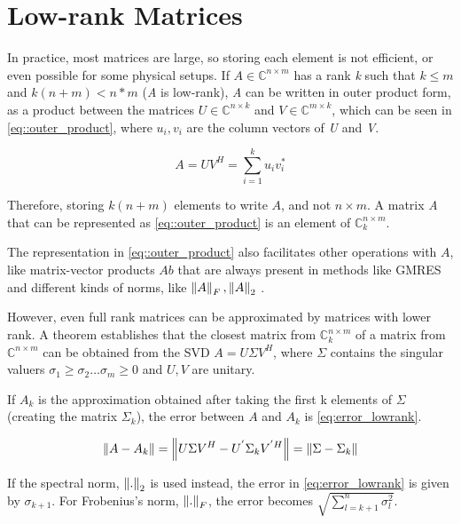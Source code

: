 \section{Low-rank Matrices}

In practice, most matrices are large, so storing each element is not efficient, or even possible for some physical setups. If $A \in \mathbb{C}^{n\times m}$ has a rank \textit{k} such that $k \leq m$ and $k(n+m) < n*m$ (\textit{A} is low-rank), \textit{A} can be written in outer product form, as a product between the matrices $U \in \mathbb{C}^{n\times k} $ and $V \in \mathbb{C}^{m\times k}$, which can be seen in \ref{eq::outer_product}, where $u_{i}, v_{i}$ are the column vectors of \textit{U} and \textit{V}.

\begin{equation}\label{eq::outer_product}
    A = UV^{H} = \sum_{i=1} ^{k} u_{i} v_{i} ^{*}
\end{equation}


Therefore, storing $k(n+m)$ elements to write $A$, and not $n\times m$. A matrix \textit{A} that can be represented as \ref{eq::outer_product} is an element of $\mathbb{C}^{n\times m}_{k}$.

The representation in \ref{eq::outer_product} also facilitates other operations with $A$, like matrix-vector products $Ab$ that are always present in methods like GMRES \cite{bebendorf2008hierarchical} and different kinds of norms, like $\left\lVert A\right\rVert_{F}, \left\lVert A\right\rVert_{2}$ \cite{bebendorf2008hierarchical}.

However, even full rank matrices can be approximated by matrices with lower rank. A theorem \cite{bebendorf2008hierarchical} establishes that the closest matrix from $\mathbb{C}^{n\times m}_{k}$ of a matrix from $\mathbb{C}^{n\times m}$ can be obtained from the SVD $A = U \Sigma V^{H}$, where $\Sigma$ contains the singular valuers $\sigma_{1} \geq \sigma_{2} \dots \sigma_{m} \geq 0$ and $U,V$ are unitary.

If $ A_{k} $ is the approximation obtained after taking the first k elements of $\Sigma$ (creating the matrix $ \Sigma_{k} $), the error between $ A $ and $ A_{k} $ is \ref{eq:error_lowrank}.

\begin{equation}\label{eq:error_lowrank}
    \left\lVert A-A_{k}\right\rVert = \left\lVert U\Sigma V^{H} - U^{'} \Sigma_{k} V^{' H}\right\rVert = \left\lVert\Sigma - \Sigma_{k}\right\rVert
\end{equation}

If the spectral norm, $\left\lVert.\right\rVert_{2} $ is used instead, the error in \ref{eq:error_lowrank} is given by $\sigma_{k+1}$. For Frobenius's norm, $\left\lVert.\right\rVert_{F}$, the error becomes $\sqrt{\sum^{n}_{l=k+1} \sigma^{2}_{l}}$.


